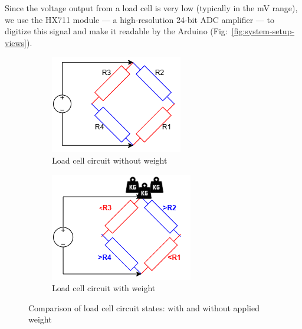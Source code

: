 Since the voltage output from a load cell is very low (typically in the mV range), we use the HX711 module — a high-resolution 24-bit ADC amplifier — to digitize this signal and make it readable by the Arduino (Fig:~\ref{fig:system-setup-views}).
\begin{figure}[H]
    \centering
    \begin{subfigure}[b]{0.45\linewidth}
        \centering
        \includegraphics[width=\linewidth]{assets/load cell images/loadcell_curcuit-.drawio.png}
        \caption{Load cell circuit without weight}
        \label{fig:loadcell-weight}
    \end{subfigure}
    \hfill
    \begin{subfigure}[b]{0.45\linewidth}
        \centering
        \includegraphics[width=\linewidth]{assets/load cell images/loadcell_curcuit-weight.drawio.png}
        \caption{Load cell circuit with weight}
        \label{fig:loadcell-noweight}
    \end{subfigure}
    \caption{Comparison of load cell circuit states: with and without applied weight}
    \label{fig:loadcell-circuit-comparison}
\end{figure}
